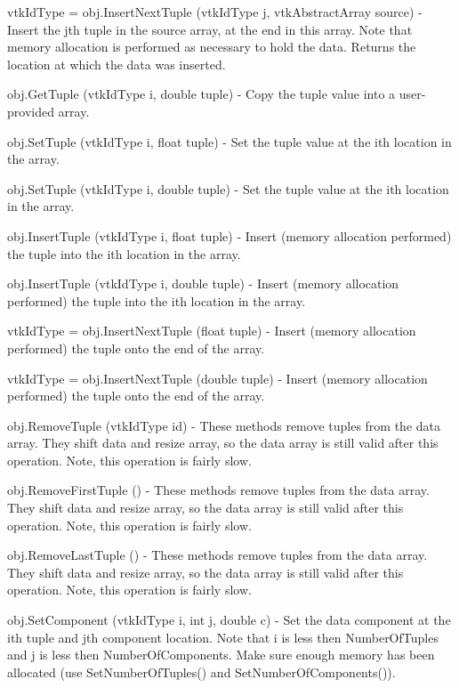 \begin{DoxyItemize}
\item {\ttfamily vtk\-Id\-Type = obj.\-Insert\-Next\-Tuple (vtk\-Id\-Type j, vtk\-Abstract\-Array source)} -\/ Insert the jth tuple in the source array, at the end in this array. Note that memory allocation is performed as necessary to hold the data. Returns the location at which the data was inserted.  
\item {\ttfamily obj.\-Get\-Tuple (vtk\-Id\-Type i, double tuple)} -\/ Copy the tuple value into a user-\/provided array.  
\item {\ttfamily obj.\-Set\-Tuple (vtk\-Id\-Type i, float tuple)} -\/ Set the tuple value at the ith location in the array.  
\item {\ttfamily obj.\-Set\-Tuple (vtk\-Id\-Type i, double tuple)} -\/ Set the tuple value at the ith location in the array.  
\item {\ttfamily obj.\-Insert\-Tuple (vtk\-Id\-Type i, float tuple)} -\/ Insert (memory allocation performed) the tuple into the ith location in the array.  
\item {\ttfamily obj.\-Insert\-Tuple (vtk\-Id\-Type i, double tuple)} -\/ Insert (memory allocation performed) the tuple into the ith location in the array.  
\item {\ttfamily vtk\-Id\-Type = obj.\-Insert\-Next\-Tuple (float tuple)} -\/ Insert (memory allocation performed) the tuple onto the end of the array.  
\item {\ttfamily vtk\-Id\-Type = obj.\-Insert\-Next\-Tuple (double tuple)} -\/ Insert (memory allocation performed) the tuple onto the end of the array.  
\item {\ttfamily obj.\-Remove\-Tuple (vtk\-Id\-Type id)} -\/ These methods remove tuples from the data array. They shift data and resize array, so the data array is still valid after this operation. Note, this operation is fairly slow.  
\item {\ttfamily obj.\-Remove\-First\-Tuple ()} -\/ These methods remove tuples from the data array. They shift data and resize array, so the data array is still valid after this operation. Note, this operation is fairly slow.  
\item {\ttfamily obj.\-Remove\-Last\-Tuple ()} -\/ These methods remove tuples from the data array. They shift data and resize array, so the data array is still valid after this operation. Note, this operation is fairly slow.  
\item {\ttfamily obj.\-Set\-Component (vtk\-Id\-Type i, int j, double c)} -\/ Set the data component at the ith tuple and jth component location. Note that i is less then Number\-Of\-Tuples and j is less then Number\-Of\-Components. Make sure enough memory has been allocated (use Set\-Number\-Of\-Tuples() and Set\-Number\-Of\-Components()).  

\end{DoxyItemize}

